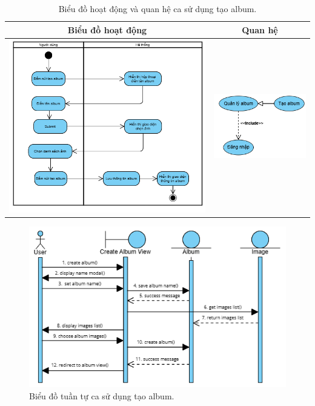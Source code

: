 \vspace{0.8cm}

\noindent 
\begin{table}[H]
\centering
\begin{tabular}{| c | c |}
    \hline
    \textbf{Biểu đồ hoạt động} & \textbf{Quan hệ} \\ 
    \hline
    \includegraphics[width=0.6\linewidth]{figures/c3/3-3-7-activity-diagram.png} 
    &  
    \includegraphics[width=0.35\linewidth]{figures/c3/3-3-7-relationship.png} \\ 
    \hline
\end{tabular}
\caption{Biểu đồ hoạt động và quan hệ ca sử dụng tạo album.}
\label{tab:create-album-usecase-activity}
\end{table}

\noindent
\begin{figure}[H]
    \centering  
    \includegraphics[width=1\textwidth]{figures/c3/3-3-7-sequence-diagram.png}
    \caption{Biểu đồ tuần tự ca sử dụng tạo album.}
    \label{fig:3-3-7-sequence-diagram}
\end{figure}
